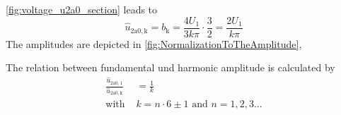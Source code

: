 \begin{solutionblock}
    

    \autoref{fig:voltage_u2a0_section} leads to
    \begin{equation}
        \hat{u}_\mathrm{2a0,k} = b_\mathrm{k} = \frac{4U_{\mathrm{1}}}{3k\pi} \cdot \frac{3}{2}=\frac{2U_{\mathrm{1}}}{k\pi}
        \label{eq:Ex07T2_FundamentelVoltage}
    \end{equation}   
    The amplitudes are depicted in \autoref{fig:NormalizationToTheAmplitude},
    
    The relation between fundamental und harmonic amplitude is calculated by
    \begin{equation}
        \begin{split}        
            \frac{\hat{u}_\mathrm{2a0,1}}{\hat{u}_\mathrm{2a0,k}} &= \frac{1}{k} \\
            \text{with } &k=n \cdot 6\pm1 \text{ and } n=1,2,3...
        \end{split}         
    \end{equation}   
    \label{subtask:Ex07T2_FourierSeries}
 \end{solutionblock}

